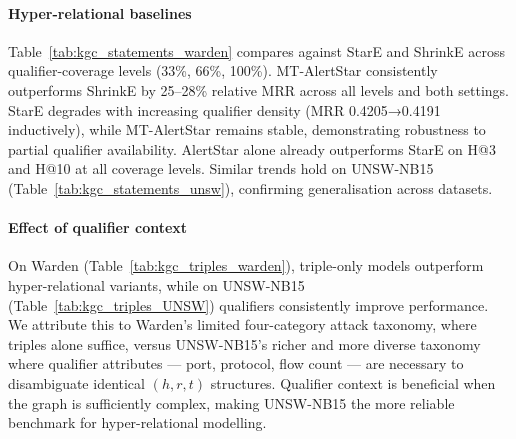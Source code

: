 \documentclass[10pt,journal,compsoc]{IEEEtran}
\begin{document}
\paragraph*{Hyper-relational baselines}
Table~\ref{tab:kgc_statements_warden} compares against
StarE and ShrinkE across qualifier-coverage levels
(33\%, 66\%, 100\%). MT-AlertStar consistently
outperforms ShrinkE by 25--28\% relative MRR across
all levels and both settings. StarE degrades with
increasing qualifier density (MRR 0.4205→0.4191
inductively), while MT-AlertStar remains stable,
demonstrating robustness to partial qualifier
availability. AlertStar alone already
outperforms StarE on H@3 and H@10 at all coverage
levels. Similar trends hold on UNSW-NB15
(Table~\ref{tab:kgc_statements_unsw}), confirming
generalisation across datasets.

\paragraph*{Effect of qualifier context}
On Warden (Table~\ref{tab:kgc_triples_warden}),
triple-only models outperform hyper-relational
variants, while on UNSW-NB15
(Table~\ref{tab:kgc_triples_UNSW}) qualifiers
consistently improve performance. We attribute this
to Warden's limited four-category attack taxonomy,
where triples alone suffice, versus UNSW-NB15's
richer and more diverse taxonomy where qualifier
attributes --- port, protocol, flow count ---
are necessary to disambiguate identical $(h,r,t)$
structures. Qualifier context is beneficial when the
graph is sufficiently complex, making UNSW-NB15
the more reliable benchmark for hyper-relational
modelling.
\end{document}

